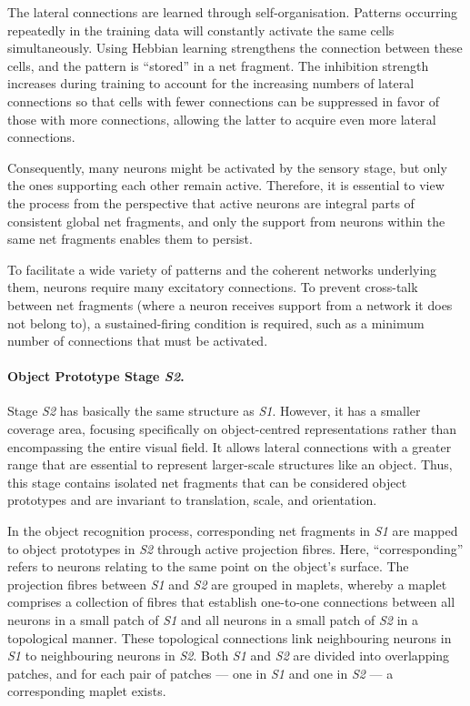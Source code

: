 The lateral connections are learned through self-organisation. Patterns occurring repeatedly in the training data will constantly activate the same cells simultaneously. Using Hebbian learning strengthens the connection between these cells, and the pattern is ``stored'' in a net fragment. The inhibition strength increases during training to account for the increasing numbers of lateral connections so that cells with fewer connections can be suppressed in favor of those with more connections, allowing the latter to acquire even more lateral connections.

Consequently, many neurons might be activated by the sensory stage, but only the ones supporting each other remain active.
Therefore, it is essential to view the process from the perspective that active neurons are integral parts of consistent global net fragments, and only the support from neurons within the same net fragments enables them to persist.

To facilitate a wide variety of patterns and the coherent networks underlying them, neurons require many excitatory connections. To prevent cross-talk between net fragments (where a neuron receives support from a network it does not belong to), a sustained-firing condition is required, such as a minimum number of connections that must be activated.

\paragraph{Object Prototype Stage \emph{S2}.} Stage \emph{S2} has basically the same structure as \emph{S1}. However, it has a smaller coverage area, focusing specifically on object-centred representations rather than encompassing the entire visual field. It allows lateral connections with a greater range that are essential to represent larger-scale structures like an object. 
Thus, this stage contains isolated net fragments that can be considered object prototypes and are invariant to translation, scale, and orientation.

In the object recognition process, corresponding net fragments in \emph{S1} are mapped to object prototypes in \emph{S2} through active projection fibres. Here, ``corresponding'' refers to neurons relating to the same point on the object's surface.
The projection fibres between \emph{S1} and \emph{S2} are grouped in maplets, whereby a maplet comprises a collection of fibres that establish one-to-one connections between all neurons in a small patch of \emph{S1} and all neurons in a small patch of \emph{S2} in a topological manner. These topological connections link neighbouring neurons in \emph{S1} to neighbouring neurons in \emph{S2}. Both \emph{S1} and \emph{S2} are divided into overlapping patches, and for each pair of patches — one in \emph{S1} and one in \emph{S2} — a corresponding maplet exists.

